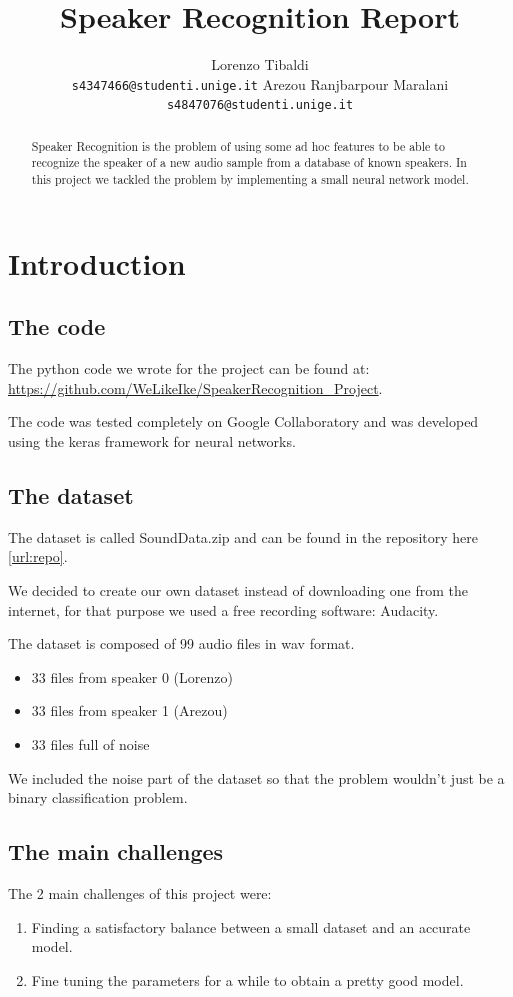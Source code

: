 \documentclass{article}
\title{Speaker Recognition Report}
\author{
	Lorenzo Tibaldi\\
	\texttt{s4347466@studenti.unige.it}
	\AND 
	Arezou Ranjbarpour Maralani\\
  	\texttt{s4847076@studenti.unige.it}}
\begin{document}
\maketitle
\begin{abstract}
Speaker Recognition is the problem of using some ad hoc features 
to be able to recognize the speaker of a new audio sample from a database of known speakers.
In this project we tackled the problem by implementing a small neural network model.
\end{abstract}

\section{Introduction}
	\subsection{The code}
	The python code we wrote for the project can be found at: \url{https://github.com/WeLikeIke/SpeakerRecognition_Project}.\label{url:repo}

	The code was tested completely on Google Collaboratory and was developed using the keras framework for neural networks.

	\subsection{The dataset}
	The dataset is called SoundData.zip and can be found in the repository here \ref{url:repo}.

	We decided to create our own dataset instead of downloading one from the internet, for that purpose we used a free recording software: Audacity.

	The dataset is composed of 99 audio files in wav format.
	\begin{itemize}
	\item 33 files from speaker 0 (Lorenzo)
	\item 33 files from speaker 1 (Arezou)
	\item 33 files full of noise
	\end{itemize}
	We included the noise part of the dataset so that the problem wouldn't just be a binary classification problem.

	\subsection{The main challenges}
	The 2 main challenges of this project were:
	\begin{enumerate}
	\item Finding a satisfactory balance between a small dataset and an accurate model.
	\item Fine tuning the parameters for a while to obtain a pretty good model.
	\end{enumerate}
\end{document}
